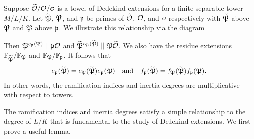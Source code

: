     Suppose \(\wtilde{\mc{O}}/\mc{O}/\smc{O}\) is a tower of Dedekind extensions for a finite separable tower \(M/L/K\). Let \(\widetilde{\mathfrak{P}}\), \(\mathfrak{P}\), and \(\mathfrak{p}\) be primes of \(\widetilde{\mathcal{O}}\), \(\mathcal{O}\), and \(\smc{O}\) respectively with \(\widetilde{\mathfrak{P}}\) above \(\mathfrak{P}\) and \(\mathfrak{P}\) above \(\mathfrak{p}\). We illustrate this relationship via the diagram
    \begin{center}
    \end{center} 
    Then \(\mathfrak{P}^{e_{\mathfrak{p}}(\mathfrak{P})} \mid\mid \mathfrak{p}\mathcal{O}\) and \(\widetilde{\mathfrak{P}}^{e_{\mathfrak{P}}(\widetilde{\mathfrak{P}})} \mid\mid \mathfrak{P}\widetilde{\mathcal{O}}\). We also have the residue extensions \(\mathbb{F}_{\widetilde{\mathfrak{P}}}/\mathbb{F}_{\mathfrak{P}}\) and \(\mathbb{F}_{\mathfrak{P}}/\mathbb{F}_{\mathfrak{p}}\). It follows that
    \begin{equation}\label{equ:ramification_and_interia_towers}
      e_{\mathfrak{p}}(\widetilde{\mathfrak{P}}) = e_{\mathfrak{P}}(\widetilde{\mathfrak{P}})e_{\mathfrak{p}}(\mathfrak{P}) \quad \text{and} \quad f_{\mathfrak{p}}(\widetilde{\mathfrak{P}}) = f_{\mathfrak{P}}(\widetilde{\mathfrak{P}})f_{\mathfrak{p}}(\mathfrak{P}).
    \end{equation}
    In other words, the ramification indices and inertia degrees are multiplicative with respect to towers.

    The ramification indices and inertia degrees satisfy a simple relationship to the degree of \(L/K\) that is fundamental to the study of Dedekind extensions. We first prove a useful lemma.

